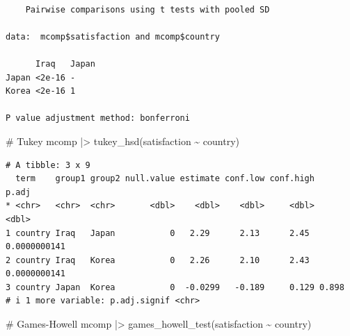 \documentclass[
  letterpaper,
]{krantz}
\makeatletter
\newenvironment{Shaded}{\begin{snugshade}}{\end{snugshade}}
\newcommand{\AlertTok}[1]{\textcolor[rgb]{0.68,0.00,0.00}{#1}}
\newcommand{\AttributeTok}[1]{\textcolor[rgb]{0.40,0.45,0.13}{#1}}
\newcommand{\CommentTok}[1]{\textcolor[rgb]{0.37,0.37,0.37}{#1}}
\newcommand{\FunctionTok}[1]{\textcolor[rgb]{0.28,0.35,0.67}{#1}}
\newcommand{\NormalTok}[1]{\textcolor[rgb]{0.00,0.23,0.31}{#1}}
\newcommand{\SpecialCharTok}[1]{\textcolor[rgb]{0.37,0.37,0.37}{#1}}
\newcommand{\StringTok}[1]{\textcolor[rgb]{0.13,0.47,0.30}{#1}}
\newenvironment{kframe}{%
\medskip{}
\setlength{\fboxsep}{.8em}
 \def\at@end@of@kframe{}%
 \ifinner\ifhmode%
  \def\at@end@of@kframe{\end{minipage}}%
  \begin{minipage}{\columnwidth}%
 \fi\fi%
 \def\FrameCommand##1{\hskip\@totalleftmargin \hskip-\fboxsep
 \colorbox{shadecolor}{##1}\hskip-\fboxsep
     \hskip-\linewidth \hskip-\@totalleftmargin \hskip\columnwidth}%
 \MakeFramed {\advance\hsize-\width
   \@totalleftmargin\z@ \linewidth\hsize
   \@setminipage}}%
 {\par\unskip\endMakeFramed%
 \at@end@of@kframe}
\renewenvironment{Shaded}{\begin{kframe}}{\end{kframe}}
\makeatother
\begin{document}
\begin{Shaded}
\end{Shaded}

\begin{verbatim}

    Pairwise comparisons using t tests with pooled SD 

data:  mcomp$satisfaction and mcomp$country 

      Iraq   Japan
Japan <2e-16 -    
Korea <2e-16 1    

P value adjustment method: bonferroni 
\end{verbatim}

\begin{Shaded}
\begin{Highlighting}[]
\CommentTok{\# Tukey}
\NormalTok{mcomp }\SpecialCharTok{|\textgreater{}} \FunctionTok{tukey\_hsd}\NormalTok{(satisfaction }\SpecialCharTok{\textasciitilde{}}\NormalTok{ country)}
\end{Highlighting}
\end{Shaded}

\begin{verbatim}
# A tibble: 3 x 9
  term    group1 group2 null.value estimate conf.low conf.high        p.adj
* <chr>   <chr>  <chr>       <dbl>    <dbl>    <dbl>     <dbl>        <dbl>
1 country Iraq   Japan           0   2.29      2.13      2.45  0.0000000141
2 country Iraq   Korea           0   2.26      2.10      2.43  0.0000000141
3 country Japan  Korea           0  -0.0299   -0.189     0.129 0.898       
# i 1 more variable: p.adj.signif <chr>
\end{verbatim}

\begin{Shaded}
\begin{Highlighting}[]
\CommentTok{\# Games{-}Howell}
\NormalTok{mcomp }\SpecialCharTok{|\textgreater{}} \FunctionTok{games\_howell\_test}\NormalTok{(satisfaction }\SpecialCharTok{\textasciitilde{}}\NormalTok{ country)}
\end{Highlighting}
\end{Shaded}
\end{document}
